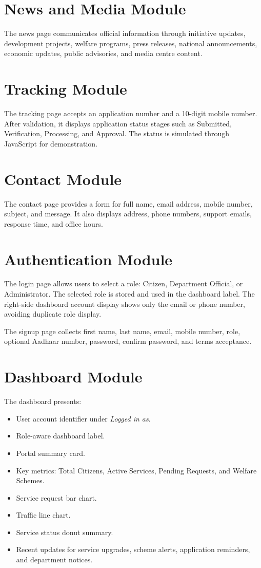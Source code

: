 \documentclass[12pt,a4paper]{report}
\begin{document}
\section{News and Media Module}
The news page communicates official information through initiative updates, development projects, welfare programs, press releases, national announcements, economic updates, public advisories, and media centre content.

\section{Tracking Module}
The tracking page accepts an application number and a 10-digit mobile number. After validation, it displays application status stages such as Submitted, Verification, Processing, and Approval. The status is simulated through JavaScript for demonstration.

\section{Contact Module}
The contact page provides a form for full name, email address, mobile number, subject, and message. It also displays address, phone numbers, support emails, response time, and office hours.

\section{Authentication Module}
The login page allows users to select a role: Citizen, Department Official, or Administrator. The selected role is stored and used in the dashboard label. The right-side dashboard account display shows only the email or phone number, avoiding duplicate role display.

The signup page collects first name, last name, email, mobile number, role, optional Aadhaar number, password, confirm password, and terms acceptance.

\section{Dashboard Module}
The dashboard presents:
\begin{itemize}[leftmargin=0.4in]
    \item User account identifier under \textit{Logged in as}.
    \item Role-aware dashboard label.
    \item Portal summary card.
    \item Key metrics: Total Citizens, Active Services, Pending Requests, and Welfare Schemes.
    \item Service request bar chart.
    \item Traffic line chart.
    \item Service status donut summary.
    \item Recent updates for service upgrades, scheme alerts, application reminders, and department notices.
\end{itemize}
\end{document}
